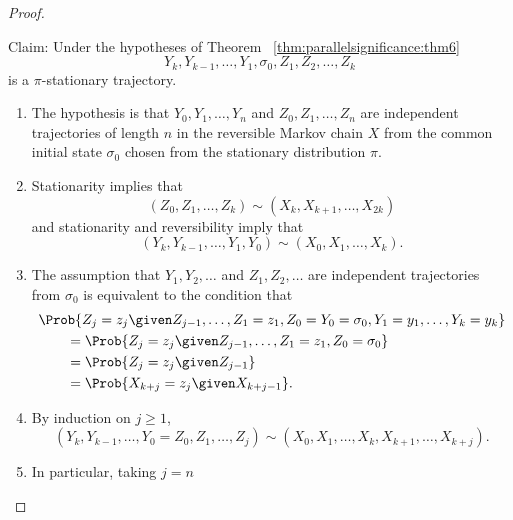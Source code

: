 \documentclass[12pt]{article}
\begin{document}
\begin{proof}
\begin{enumerate}
            Claim:  Under the hypotheses of Theorem~%
            \ref{thm:parallelsignificance:thm6}
            \[
                Y_k, Y_{k-1}, \dots, Y_1, \sigma_0, Z_1, Z_2, \dots, Z_k
            \] is a \( \pi \)-stationary trajectory.
            \begin{enumerate}
                \item
                    The hypothesis is that \( Y_0, Y_1, \dots, Y_n \)
                    and \( Z_0, Z_1, \dots, Z_n \) are independent
                    trajectories of length \( n \) in the reversible
                    Markov chain \( X \) from the common initial state \(
                    \sigma_0 \) chosen from the stationary distribution \(
                    \pi \).
                \item
                    Stationarity implies that
                    \[
                        (Z_0, Z_1, \dots, Z_k) \sim (X_k, X_{k+1}, \dots,
                        X_{2k})
                    \] and stationarity and reversibility imply that
                    \[
                        (Y_k, Y_{k-1}, \dots, Y_1, Y_0) \sim (X_0, X_1,
                        \dots, X_k).
                    \]
                \item
                    The assumption that \( Y_1, Y_2, \dots \) and \( Z_1,
                    Z_2, \dots \) are independent trajectories from \(
                    \sigma_0 \) is equivalent to the condition that
                    \begin{align*}
                        & \Prob{ Z_j = z_j \given Z_{j-1}, \dots, Z_1 =
                        z_1, Z_0 = Y_0=\sigma_0, Y_1=y_1, \dots, Y_k = y_k}
                        \\
                        & \qquad = \Prob{ Z_j = z_j \given Z_{j-1},
                        \dots, Z_1 = z_1, Z_0 = \sigma_0} \\
                        & \qquad = \Prob{ Z_j = z_j \given Z_{j-1}} \\
                        &\qquad = \Prob{ X_{k+j} = z_j \given X_{k+j-1}}.
                    \end{align*}
                \item
                    By induction on \( j \ge 1 \),
                    \[
                        (Y_k, Y_{k-1}, \dots, Y_0=Z_0, Z_1, \dots, Z_j)
                        \sim (X_0, X_1, \dots, X_k, X_{k+1}, \dots, X_{k+j}).
                    \]
                \item
                    In particular, taking \( j = n \)

\end{enumerate}
\end{enumerate}
\end{proof}
\end{document}
